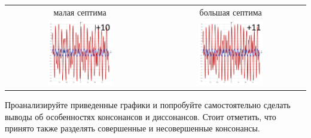 \begin{table}[!ht]
\begin{tabular}{c|c}
        малая септима           & большая септима \\
        \includegraphics[width=0.45\textwidth]{fig/intervals/i10}
            & \includegraphics[width=0.45\textwidth]{fig/intervals/i11} \\
        \hline\hline
    \end{tabular}
\end{table}

Проанализируйте приведенные графики и попробуйте самостоятельно сделать выводы об особенностях консонансов и диссонансов. Стоит отметить, что принято также разделять совершенные и несовершенные консонансы. 

